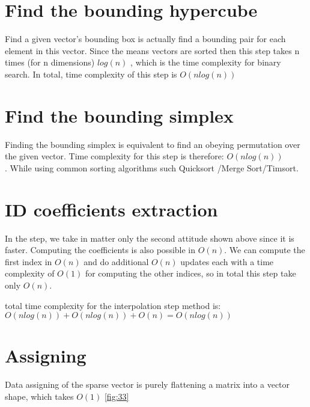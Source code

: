 \section{Find the bounding hypercube}

	Find a given vector’s bounding box is actually find a bounding pair for each element in this vector. Since the means vectors are sorted then this step takes n times (for n dimensions) $log(n)$ , which is the time complexity for binary search. In total, time complexity of this step is $O(nlog(n))$
	\break


\section{Find the bounding simplex}


Finding the bounding simplex is equivalent to find an obeying permutation over the given vector.
Time complexity for this step is therefore: $O(nlog(n))$\\. While using common sorting algorithms such Quicksort \cite{quicksort}/Merge Sort\cite{mergesort}/Timsort\cite{peters2002timsort}.


\section{ID coefficients extraction}

In the step, we take in matter only the second attitude shown above since it is faster.
Computing the coefficients is also possible in $O(n)$.
We can compute the first index in $O(n)$ and do additional $O(n)$ updates each with a time complexity of $O(1)$ for computing the other indices, so in total this step take only $O(n)$.

total time complexity for the interpolation step method is: \\

$ O(nlog(n)) + O(nlog(n)) + O(n) = O(nlog(n)) $


\section{Assigning}

Data assigning of the sparse vector is purely flattening a matrix into a vector shape, which takes $O(1)$ \ref{fig:33}



